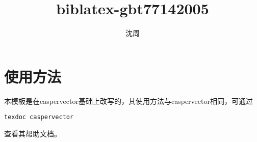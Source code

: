 \documentclass{ctexart}
\title{biblatex-gbt77142005}
\author{沈周}
\begin{document}
\maketitle
\section{使用方法}
本模板是在caspervector基础上改写的，其使用方法与caspervector相同，可通过
\begin{verbatim}
texdoc caspervector
\end{verbatim}
查看其帮助文档。
\nocite{*}
\printbibliography[title={参考文献},heading=bibintoc]
\end{document}
